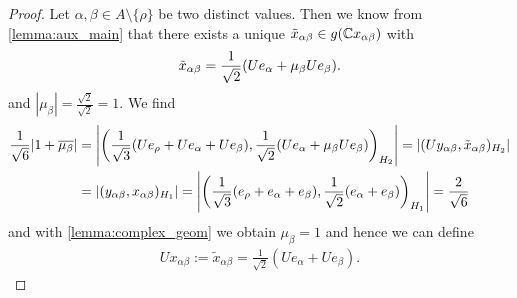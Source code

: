 \begin{proof}
	Let $\alpha, \beta \in A \setminus \{\rho\}$ be two distinct values. Then we know from \ref{lemma:aux_main} that there exists a unique $\tilde{x}_{\alpha \beta} \in g(\mathbb{C} x_{\alpha \beta})$ with
	\begin{align*}
		\tilde{x}_{\alpha \beta} = \frac{1}{\sqrt{2}} {\left ( Ue_\alpha + \mu_\beta Ue_\beta \right )}.
	\end{align*}
	and $|\mu_\beta|= \frac{\sqrt{2}}{\sqrt{2}} = 1$. We find
	\begin{align*}
		\frac{1}{\sqrt{6}} {\left | 1 + \overline{\mu_\beta} \right |} &= {\left | {\left ( \frac{1}{\sqrt{3}} {\left ( Ue_\rho + Ue_\alpha + Ue_\beta \right )}, \frac{1}{\sqrt{2}} {\left ( Ue_\alpha + \mu_\beta Ue_\beta \right )} \right )}_{H_2} \right |} = |(Uy_{\alpha \beta}, \tilde{x}_{\alpha \beta})_{H_2}| \\
		&= |(y_{\alpha \beta}, x_{\alpha \beta})_{H_1}| = {\left | {\left ( \frac{1}{\sqrt{3}} {\left ( e_\rho + e_\alpha + e_\beta \right )}, \frac{1}{\sqrt{2}} (e_\alpha + e_\beta) \right )}_{H_1} \right |} = \frac{2}{\sqrt{6}}
	\end{align*}
	and with \ref{lemma:complex_geom} we obtain $\mu_\beta = 1$ and hence we can define
	\begin{align*}
		Ux_{\alpha \beta} := \tilde{x}_{\alpha \beta} = \frac{1}{\sqrt{2}}(Ue_\alpha + Ue_\beta).
	\end{align*}
	

\end{proof}
